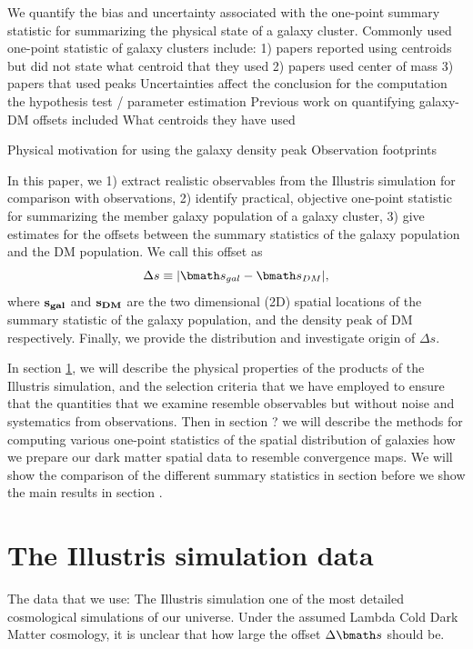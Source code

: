 \documentclass[usenatbib]{mn2e}
\renewcommand{\vec}[1]{ {\bmath #1} }
\begin{document}
We quantify the bias and uncertainty associated with the one-point summary
statistic for summarizing the physical state of a galaxy cluster. 
Commonly used one-point statistic of galaxy clusters include:
1) papers reported using centroids but did not state what centroid that they
used 
2) papers used center of mass 
3) papers that used peaks  
Uncertainties affect the conclusion for the computation the hypothesis test / parameter
estimation
Previous work on quantifying galaxy-DM offsets included  
What centroids they have used

Physical motivation for using the galaxy density peak 
Observation footprints 

In this paper, we 
1) extract realistic observables from the Illustris simulation for
comparison with observations, 2) identify practical, objective one-point statistic for 
summarizing the member galaxy population of a galaxy cluster, 3)	
give estimates for the offsets between the summary statistics of the galaxy  
population and the DM population. We call this offset as 
\begin{equation}
	\Delta s \equiv |\vec{s}_{gal} - \vec{s}_{DM}|,
\end{equation}
where $\bf{s}_{gal}$ and $\bf{s}_{DM}$ are the two dimensional (2D) spatial
locations of the summary statistic of the galaxy population, and the density
peak of DM respectively. 
Finally, we provide the distribution and investigate origin of $\Delta s$. 



In section \ref{sec:illustris_sim},
we will describe the physical properties of the products of the Illustris
simulation, and the selection criteria that we have employed to ensure that the
quantities that we examine resemble observables but without noise and
systematics from observations. Then in section ? we will describe the methods for computing various 
one-point statistics of the spatial distribution of galaxies how we prepare our dark
matter spatial data to resemble convergence maps. We will show the comparison
of the different summary statistics in section before we show the main results
in section . 

\section{The Illustris simulation data} 
\label{sec:illustris_sim}
The data that we use: The Illustris simulation 
one of the most detailed cosmological simulations of our universe. 
Under the assumed Lambda Cold Dark Matter cosmology, it is unclear 
that how large the offset $\Delta \vec{s}$ should be. 
\end{document}
